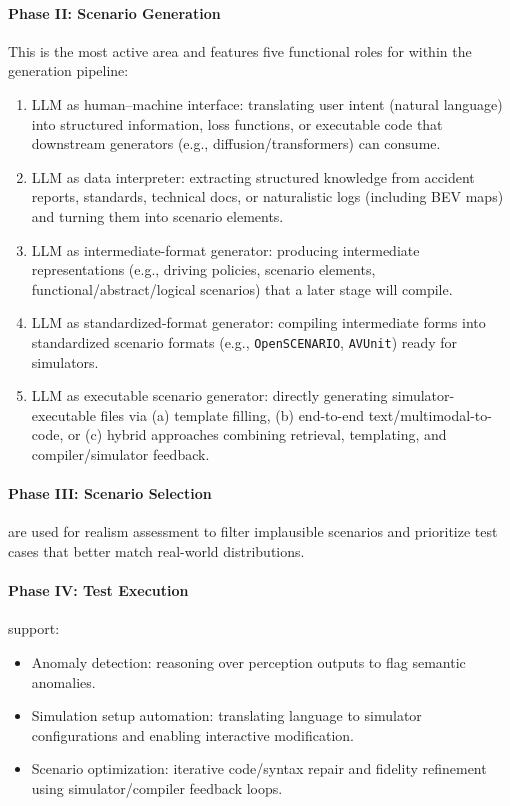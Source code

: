 \paragraph{Phase II: Scenario Generation}
This is the most active area and features five functional roles for
 within the generation pipeline:
\begin{enumerate}
    \item LLM as human–machine interface: translating user intent (natural
    language) into structured information, loss functions, or executable code
    that downstream generators (e.g., diffusion/transformers) can consume.
    \item LLM as data interpreter: extracting structured knowledge from accident
    reports, standards, technical docs, or naturalistic logs (including BEV
    maps) and turning them into scenario elements.
    \item LLM as intermediate-format generator: producing intermediate
    representations (e.g., driving policies, scenario elements,
    functional/abstract/logical scenarios) that a later stage will compile.
    \item LLM as standardized-format generator: compiling intermediate forms
    into standardized scenario formats (e.g., \texttt{OpenSCENARIO},
    \texttt{AVUnit}) ready for simulators.
    \item LLM as executable scenario generator: directly generating
    simulator-executable files via (a) template filling, (b) end-to-end
    text/multimodal-to-code, or (c) hybrid approaches combining retrieval,
    templating, and compiler/simulator feedback.
\end{enumerate}

\paragraph{Phase III: Scenario Selection}
 are used for realism assessment to filter implausible scenarios
and prioritize test cases that better match real-world distributions.

\paragraph{Phase IV: Test Execution}
 support:
\begin{itemize}
    \item Anomaly detection: reasoning over perception outputs to flag semantic
    anomalies.
    \item Simulation setup automation: translating language to simulator
    configurations and enabling interactive modification.
    \item Scenario optimization: iterative code/syntax repair and fidelity
    refinement using simulator/compiler feedback loops.
\end{itemize}

